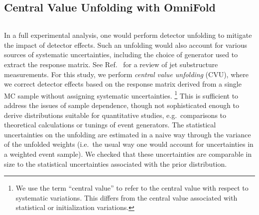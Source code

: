 \documentclass[aps,prd,twocolumn,preprintnumbers,nofootinbib,longbibliography,floatfix]{revtex4-1}
\DeclareRobustCommand{\Ref}[1]{Ref.~\cite{#1}}
\newcommand{\OmniFold}{{\sc OmniFold}\xspace}
\begin{document}
\subsection{Central Value Unfolding with \OmniFold}
\label{sec:cvu}



\begin{figure*}[t]
	\centering
	$\quad$
	\caption{
		The weight distribution produced by central value unfolding after (a) step 1 and (b) step 2 of the \OmniFold algorithm. 
		The initial weights from the CMS Open Data are shown in blue, where the spikes arise because there are six independent samples that have been individually unweighted.
		The results in this paper correspond to using weights from iteration 4, after step 2.
	}
	\label{fig:unfoldedweights}
\end{figure*}


In a full experimental analysis, one would perform detector unfolding to mitigate the impact of detector effects.
%
Such an unfolding would also account for various sources of systematic uncertainties, including the choice of generator used to extract the response matrix.
%
See \Ref{Kogler:2018hem} for a review of jet substructure measurements.
%
For this study, we perform \emph{central value unfolding} (CVU), where we correct detector effects based on the response matrix derived from a single MC sample without assigning systematic uncertainties.%
%
\footnote{We use the term ``central value'' to refer to the central value with respect to systematic variations.  This differs from the central value associated with statistical or initialization variations.}
%
This is sufficient to address the issues of sample dependence, though not sophisticated enough to derive distributions suitable for quantitative studies, e.g.~comparisons to theoretical calculations or tunings of event generators.
%
The statistical uncertainties on the unfolding are estimated in a naive way through the variance of the unfolded weights (i.e.~the usual way one would account for uncertainties in a weighted event sample).
%
We checked that these uncertainties are comparable in size to the statistical uncertainties associated with the prior distribution.
\end{document}
